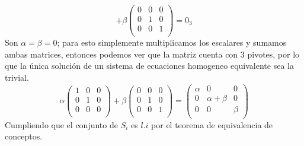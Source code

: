 \begin{enumerate}[label=\listAlph]
\[                +
                \beta
                \begin{pmatrix}
                    0 & 0 & 0 \\
                    0 & 1 & 0 \\
                    0 & 0 & 1 \\
                \end{pmatrix}
                =
                0_3
            \]
            Son \(\alpha = \beta = 0\); para esto simplemente multiplicamos los escalares y sumamos ambas matrices, 
            entonces podemos ver que la matriz cuenta con 3 pivotes, por lo que la única solución de un sistema de ecuaciones 
            homogeneo equivalente sea la trivial.
            \[
                \alpha
                \begin{pmatrix}
                    1 & 0 & 0 \\
                    0 & 1 & 0 \\
                    0 & 0 & 0 \\
                \end{pmatrix}
                +
                \beta
                \begin{pmatrix}
                    0 & 0 & 0 \\
                    0 & 1 & 0 \\
                    0 & 0 & 1 \\
                \end{pmatrix}
                =
                \begin{pmatrix}
                    \alpha & 0 & 0 \\
                    0 & \alpha + \beta & 0 \\
                    0 & 0 & \beta \\
                \end{pmatrix}
            \]
            Cumpliendo que el conjunto de \(S_i\) es \(l.i\) por el teorema de equivalencia de conceptos.
    \end{enumerate}
